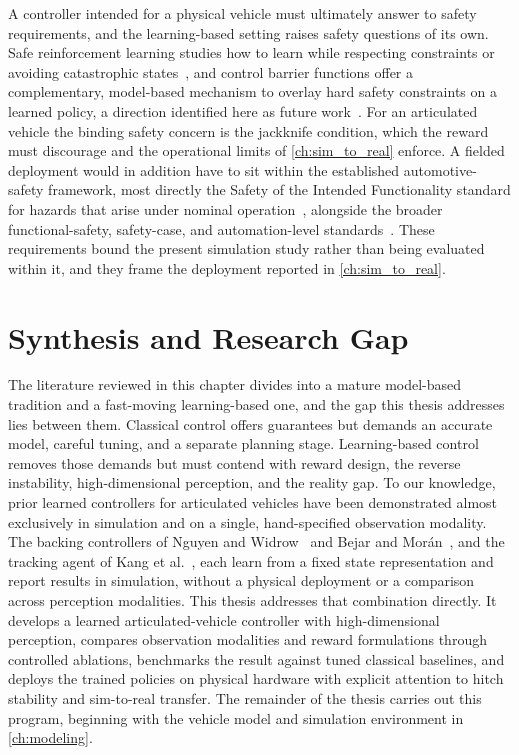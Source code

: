 A controller intended for a physical vehicle must ultimately answer to safety requirements, and the learning-based setting raises safety questions of its own. Safe reinforcement learning studies how to learn while respecting constraints or avoiding catastrophic states~\cite{garcia2015saferl}, and control barrier functions offer a complementary, model-based mechanism to overlay hard safety constraints on a learned policy, a direction identified here as future work~\cite{ames2019cbf}. For an articulated vehicle the binding safety concern is the jackknife condition, which the reward must discourage and the operational limits of \cref{ch:sim_to_real} enforce. A fielded deployment would in addition have to sit within the established automotive-safety framework, most directly the Safety of the Intended Functionality standard for hazards that arise under nominal operation~\cite{iso21448}, alongside the broader functional-safety, safety-case, and automation-level standards~\cite{iso26262, ul4600, sae_j3016}. These requirements bound the present simulation study rather than being evaluated within it, and they frame the deployment reported in \cref{ch:sim_to_real}.

\section{Synthesis and Research Gap}

The literature reviewed in this chapter divides into a mature model-based tradition and a fast-moving learning-based one, and the gap this thesis addresses lies between them. Classical control offers guarantees but demands an accurate model, careful tuning, and a separate planning stage. Learning-based control removes those demands but must contend with reward design, the reverse instability, high-dimensional perception, and the reality gap. To our knowledge, prior learned controllers for articulated vehicles have been demonstrated almost exclusively in simulation and on a single, hand-specified observation modality. The backing controllers of Nguyen and Widrow~\cite{nguyen1990truck} and Bejar and Mor\'an~\cite{bejar2018backing}, and the tracking agent of Kang et al.~\cite{kang2024tractortrailer}, each learn from a fixed state representation and report results in simulation, without a physical deployment or a comparison across perception modalities. This thesis addresses that combination directly. It develops a learned articulated-vehicle controller with high-dimensional perception, compares observation modalities and reward formulations through controlled ablations, benchmarks the result against tuned classical baselines, and deploys the trained policies on physical hardware with explicit attention to hitch stability and sim-to-real transfer. The remainder of the thesis carries out this program, beginning with the vehicle model and simulation environment in \cref{ch:modeling}.
